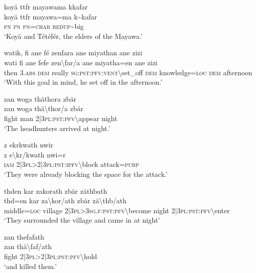 \ea\label{ex:4:a1688}
koyä ttfr mayawama kkafar\\
\gll koyä	ttfr	mayawa=ma	k{\textasciitilde}kafar\\
     \textsc{pn}	\textsc{pn}	\textsc{pn}=\textsc{char}	\textsc{redup}{\textasciitilde}big\\
\glt `Koyä and Tétéfér, the elders of the Mayawa.'
\z

\ea\label{ex:4:a1690}
watik, fi ane fé zenfara ane miyathan ane zizi\\
\gll wati	fi	ane	fefe	zen{\textbackslash}far/a	ane	miyatha=en	ane	zizi\\
     then	3.\textsc{abs}	\textsc{dem}	really	\textsc{sg}:\textsc{pst}:\textsc{pfv}:\textsc{vent}{\textbackslash}set\_off	\textsc{dem}	knowledge=\textsc{loc}	\textsc{dem}	afternoon\\
\glt `With this goal in mind, he set off in the afternoon.'
\z

\ea\label{ex:4:a1691}
zan woga thäthora zbär\\
\gll zan	woga	thä{\textbackslash}thor/a	zbär\\
     fight	man	2|3\textsc{pl}:\textsc{pst}:\textsc{pfv}{\textbackslash}appear	night\\
\glt `The headhunters arrived at night.'
\z

\ea\label{ex:4:a1692}
z ekrkwath nwir\\
\gll z	e{\textbackslash}kr/kwath	nwi=r\\
     \textsc{iam}	2|3\textsc{pl}>2|3\textsc{pl}:\textsc{pst}:\textsc{ipfv}{\textbackslash}block	attack=\textsc{purp}\\
\glt `They were already blocking the space for the attack.'
\z

\ea\label{ex:4:a1693}
thden kar zakorath zbär zäthbath\\
\gll thd=en	kar	za{\textbackslash}kor/ath	zbär	zä{\textbackslash}thb/ath\\
     middle=\textsc{loc}	village	2|3\textsc{pl}>3\textsc{sg}.\textsc{f}:\textsc{pst}:\textsc{pfv}{\textbackslash}become	night	2|3\textsc{pl}:\textsc{pst}:\textsc{pfv}{\textbackslash}enter\\
\glt `They surrounded the village and came in at night'
\z

\ea\label{ex:4:a1694}
zan thefafath\\
\gll zan	thä{\textbackslash}faf/ath\\
     fight	2|3\textsc{pl}>2|3\textsc{pl}:\textsc{pst}:\textsc{pfv}{\textbackslash}hold\\
\glt `and killed them.'
\z

